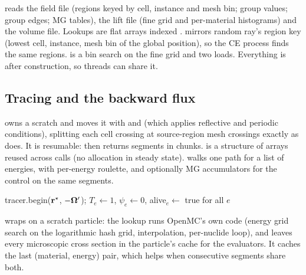 reads the field file (regions keyed by cell, instance and mesh bin; group values;
group edges; MG tables), the lift file (fine grid and per-material histograms) and the volume file.
Lookups are flat arrays indexed \code{[(t*R + r)*G + g]}.  mirrors random ray's region
key (lowest cell, instance, mesh bin of the global position), so the CE process finds the same
regions.  is a bin search on the fine grid and two loads. Everything is
 after construction, so threads can share it.

\subsection{Tracing and the backward flux}

 owns a scratch  and moves it with
 and  (which applies reflective and
periodic conditions), splitting each cell crossing at source-region mesh crossings exactly as
 does. It is resumable:  then 
returns segments in chunks.  is a structure of arrays reused across calls (no
allocation in steady state).  walks one path for a list of energies,
with per-energy roulette, and optionally MG accumulators for the control on the same segments.

\begin{algorithm}[h]
\caption{Backward $\psi$ for several energies on one path}\label{alg:psi}
\DontPrintSemicolon
{}
tracer.begin($\mathbf r^\star$, $-\boldsymbol\Omega'$); $T_e\gets1$, $\psi_e\gets0$, alive$_e\gets$ true for all $e$\;
\end{algorithm}

 wraps  on a scratch particle: the lookup runs OpenMC's
own code (energy grid search on the logarithmic hash grid, interpolation, per-nuclide loop), and
leaves every microscopic cross section in the particle's cache for the evaluators. It caches the
last (material, energy) pair, which helps when consecutive segments share both.

